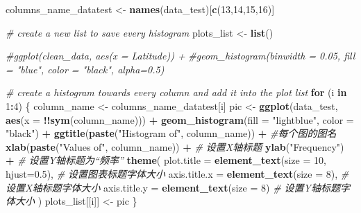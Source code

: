 \documentclass[
]{article}
\newenvironment{Shaded}{\begin{snugshade}}{\end{snugshade}}
\newcommand{\AttributeTok}[1]{\textcolor[rgb]{0.13,0.29,0.53}{#1}}
\newcommand{\CommentTok}[1]{\textcolor[rgb]{0.56,0.35,0.01}{\textit{#1}}}
\newcommand{\ControlFlowTok}[1]{\textcolor[rgb]{0.13,0.29,0.53}{\textbf{#1}}}
\newcommand{\DecValTok}[1]{\textcolor[rgb]{0.00,0.00,0.81}{#1}}
\newcommand{\FloatTok}[1]{\textcolor[rgb]{0.00,0.00,0.81}{#1}}
\newcommand{\FunctionTok}[1]{\textcolor[rgb]{0.13,0.29,0.53}{\textbf{#1}}}
\newcommand{\NormalTok}[1]{#1}
\newcommand{\OtherTok}[1]{\textcolor[rgb]{0.56,0.35,0.01}{#1}}
\newcommand{\SpecialCharTok}[1]{\textcolor[rgb]{0.81,0.36,0.00}{\textbf{#1}}}
\newcommand{\StringTok}[1]{\textcolor[rgb]{0.31,0.60,0.02}{#1}}
\begin{document}
\begin{Shaded}
\begin{Highlighting}[]
\NormalTok{columns\_name\_datatest }\OtherTok{\textless{}{-}} \FunctionTok{names}\NormalTok{(data\_test)[}\FunctionTok{c}\NormalTok{(}\DecValTok{13}\NormalTok{,}\DecValTok{14}\NormalTok{,}\DecValTok{15}\NormalTok{,}\DecValTok{16}\NormalTok{)]}

\CommentTok{\# create a new list to save every histogram}
\NormalTok{plots\_list }\OtherTok{\textless{}{-}} \FunctionTok{list}\NormalTok{()}

\CommentTok{\#ggplot(clean\_data, aes(x = Latitude)) + }
  \CommentTok{\#geom\_histogram(binwidth = 0.05, fill = "blue", color = "black", alpha=0.5)}

\CommentTok{\# create a histogram towards every column and add it into the plot list}
\ControlFlowTok{for}\NormalTok{ (i }\ControlFlowTok{in} \DecValTok{1}\SpecialCharTok{:}\DecValTok{4}\NormalTok{) \{}
\NormalTok{  column\_name }\OtherTok{\textless{}{-}}\NormalTok{ columns\_name\_datatest[i]}
\NormalTok{  pic }\OtherTok{\textless{}{-}} \FunctionTok{ggplot}\NormalTok{(data\_test, }\FunctionTok{aes}\NormalTok{(}\AttributeTok{x =} \SpecialCharTok{!!}\FunctionTok{sym}\NormalTok{(column\_name))) }\SpecialCharTok{+} 
    \FunctionTok{geom\_histogram}\NormalTok{(}\AttributeTok{fill =} \StringTok{"lightblue"}\NormalTok{, }\AttributeTok{color =} \StringTok{"black"}\NormalTok{) }\SpecialCharTok{+}
    \FunctionTok{ggtitle}\NormalTok{(}\FunctionTok{paste}\NormalTok{(}\StringTok{"Histogram of"}\NormalTok{, column\_name)) }\SpecialCharTok{+}   \CommentTok{\#每个图的图名}
    \FunctionTok{xlab}\NormalTok{(}\FunctionTok{paste}\NormalTok{(}\StringTok{"Values of"}\NormalTok{, column\_name)) }\SpecialCharTok{+}  \CommentTok{\# 设置X轴标题}
    \FunctionTok{ylab}\NormalTok{(}\StringTok{"Frequency"}\NormalTok{) }\SpecialCharTok{+}  \CommentTok{\# 设置Y轴标题为“频率”}
    \FunctionTok{theme}\NormalTok{(}
      \AttributeTok{plot.title =} \FunctionTok{element\_text}\NormalTok{(}\AttributeTok{size =} \DecValTok{10}\NormalTok{, }\AttributeTok{hjust=}\FloatTok{0.5}\NormalTok{),  }\CommentTok{\# 设置图表标题字体大小}
      \AttributeTok{axis.title.x =} \FunctionTok{element\_text}\NormalTok{(}\AttributeTok{size =} \DecValTok{8}\NormalTok{),  }\CommentTok{\# 设置X轴标题字体大小}
      \AttributeTok{axis.title.y =} \FunctionTok{element\_text}\NormalTok{(}\AttributeTok{size =} \DecValTok{8}\NormalTok{)   }\CommentTok{\# 设置Y轴标题字体大小}
\NormalTok{    )}
\NormalTok{  plots\_list[[i]] }\OtherTok{\textless{}{-}}\NormalTok{ pic}
\NormalTok{\}}


\end{Highlighting}
\end{Shaded}
\end{document}
